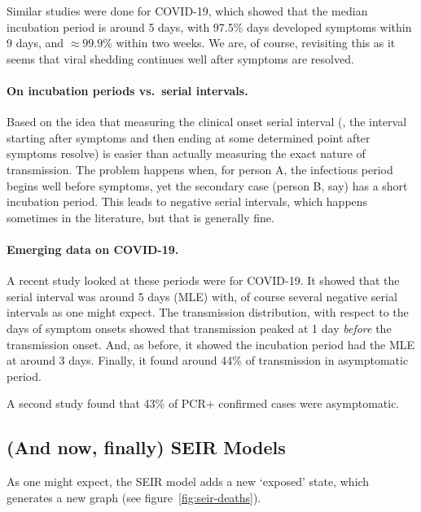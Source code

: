 \documentclass[12pt]{article}
\begin{document}
Similar studies were done for COVID-19, which showed that the median incubation period is around 5 days, with 97.5\% days developed symptoms within 9 days, and $\approx 99.9\%$ within two weeks. We are, of course, revisiting this as it seems that viral shedding continues well after symptoms are resolved.

\paragraph{On incubation periods vs.\ serial intervals.} Based on the idea that measuring the clinical onset serial interval (\ie, the interval starting after symptoms and then ending at some determined point after symptoms resolve) is easier than actually measuring the exact nature of transmission. The problem happens when, for person A, the infectious period begins well before symptoms, yet the secondary case (person B, say) has a short incubation period. This leads to negative serial intervals, which happens sometimes in the literature, but that is generally fine.

\paragraph{Emerging data on COVID-19.} A recent study looked at these periods were for COVID-19. It showed that the serial interval was around 5 days (MLE) with, of course several negative serial intervals as one might expect. The transmission distribution, with respect to the days of symptom onsets showed that transmission peaked at 1 day \emph{before} the transmission onset. And, as before, it showed the incubation period had the MLE at around 3 days. Finally, it found around 44\% of transmission in asymptomatic period.

A second study found that 43\% of PCR+ confirmed cases were asymptomatic.

\subsection{(And now, finally) SEIR Models}
As one might expect, the SEIR model adds a new `exposed' state, which generates a new graph (see figure~\ref{fig:seir-deaths}).
\end{document}
